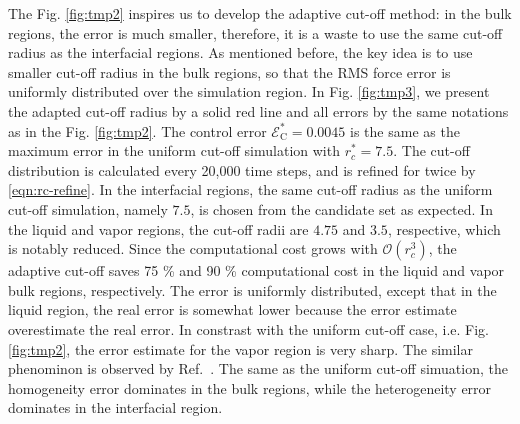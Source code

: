 \documentclass[aps,pre,preprint]{revtex4}
\begin{document}
The Fig. \ref{fig:tmp2} inspires us to develop the adaptive cut-off
method: in the bulk regions, the error is much smaller, therefore, it
is a waste to use the same cut-off radius as the interfacial
regions. As mentioned before, the key idea is to use smaller cut-off
radius in the bulk regions, so that the RMS force error is uniformly
distributed over the simulation region. In Fig. \ref{fig:tmp3}, we
present the adapted cut-off radius by a solid red line and all errors
by the same notations as in the Fig. \ref{fig:tmp2}. The control error
$\mathcal E^\ast_{\textrm{C}} = 0.0045$ is the same as the maximum
error in the uniform cut-off simulation with $r_c^\ast=7.5$. The
cut-off distribution is calculated every 20,000 time steps, and is
refined for twice by \eqref{eqn:rc-refine}. In the interfacial
regions, the same cut-off radius as the uniform cut-off simulation,
namely $7.5$, is chosen from the candidate set as expected.  In the
liquid and vapor regions, the cut-off radii are $4.75$ and $3.5$,
respective, which is notably reduced. Since the computational cost
grows with $\mathcal O(r_c^3)$, the adaptive cut-off saves 75 \% and
90 \% computational cost in the liquid and vapor bulk regions,
respectively.  The error is uniformly distributed, except that in the
liquid region, the real error is somewhat lower because the error
estimate overestimate the real error. In constrast with the uniform
cut-off case, i.e. Fig. \ref{fig:tmp2}, the error estimate for the
vapor region is very sharp. The similar phenominon is observed by
Ref.~\cite{wang2011}. The same as the uniform cut-off simuation, the
homogeneity error dominates in the bulk regions, while the
heterogeneity error dominates in the interfacial region.
\end{document}
